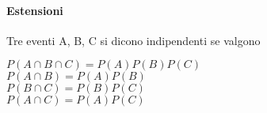 \paragraph{Estensioni}
Tre eventi A, B, C si dicono indipendenti se valgono
\begin{center}
    $P(A \cap B \cap C) = P(A)P(B)P(C)$
    \\$P(A \cap B) = P(A)P(B)$
    \\$P(B \cap C) = P(B)P(C)$
    \\$P(A \cap C) = P(A)P(C)$
\end{center}
